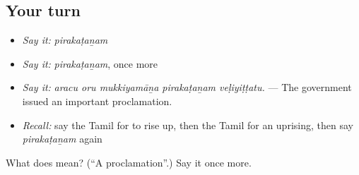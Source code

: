 \subsection*{Your turn}
\begin{itemize}
\raggedright
  \item \emph{Say it:} \emph{pirakaṭaṉam}
  \item \emph{Say it:} \emph{pirakaṭaṉam}, once more
  \item \emph{Say it:} \emph{aracu oru mukkiyamāṉa pirakaṭaṉam veḷiyiṭṭatu.} — The government issued an important proclamation.
  \item \emph{Recall:} say the Tamil for to rise up, then the Tamil for an uprising, then say \emph{pirakaṭaṉam} again
\end{itemize}

\begin{tcolorbox}[breakable,colback=teal!4,colframe=teal!35!black,title={Before you move on}]
What does  mean? (\textquotedblleft{}A proclamation\textquotedblright{}.) Say it once more.
\end{tcolorbox}
